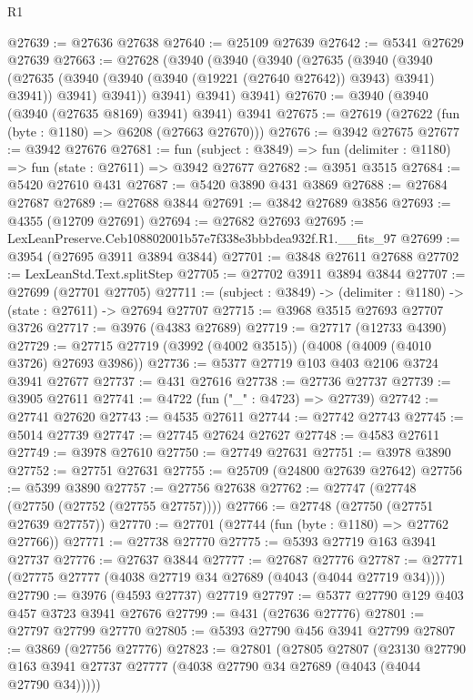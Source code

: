 \begin{lexlean}{R1}
\begin{coremodule}
@27639 := @27636 @27638
@27640 := @25109 @27639
@27642 := @5341 @27629 @27639
@27663 := @27628
    (@3940
      (@3940
        (@3940
          (@27635
            (@3940
              (@3940
                (@27635 (@3940 (@3940 (@3940 (@19221 (@27640 @27642)) @3943) @3941) @3941))
                @3941)
              @3941))
          @3941)
        @3941)
      @3941)
@27670 := @3940 (@3940 (@3940 (@27635 @8169) @3941) @3941) @3941
@27675 := @27619 (@27622 (fun (byte : @1180) => @6208 (@27663 @27670)))
@27676 := @3942 @27675
@27677 := @3942 @27676
@27681 := fun (subject : @3849) => fun (delimiter : @1180) => fun (state : @27611) => @3942 @27677
@27682 := @3951 @3515
@27684 := @5420 @27610 @431
@27687 := @5420 @3890 @431 @3869
@27688 := @27684 @27687
@27689 := @27688 @3844
@27691 := @3842 @27689 @3856
@27693 := @4355 (@12709 @27691)
@27694 := @27682 @27693
@27695 := LexLeanPreserve.Ceb108802001b57e7f338e3bbbdea932f.R1.__fits_97
@27699 := @3954 (@27695 @3911 @3894 @3844)
@27701 := @3848 @27611 @27688
@27702 := LexLeanStd.Text.splitStep
@27705 := @27702 @3911 @3894 @3844
@27707 := @27699 (@27701 @27705)
@27711 := (subject : @3849) -> (delimiter : @1180) -> (state : @27611) -> @27694 @27707
@27715 := @3968 @3515 @27693 @27707 @3726
@27717 := @3976 (@4383 @27689)
@27719 := @27717 (@12733 @4390)
@27729 := @27715 @27719 (@3992 (@4002 @3515)) (@4008 (@4009 (@4010 @3726) @27693 @3986))
@27736 := @5377 @27719 @103 @403 @2106 @3724 @3941 @27677
@27737 := @431 @27616
@27738 := @27736 @27737
@27739 := @3905 @27611
@27741 := @4722 (fun ("_" : @4723) => @27739)
@27742 := @27741 @27620
@27743 := @4535 @27611
@27744 := @27742 @27743
@27745 := @5014 @27739
@27747 := @27745 @27624 @27627
@27748 := @4583 @27611
@27749 := @3978 @27610
@27750 := @27749 @27631
@27751 := @3978 @3890
@27752 := @27751 @27631
@27755 := @25709 (@24800 @27639 @27642)
@27756 := @5399 @3890
@27757 := @27756 @27638
@27762 := @27747 (@27748 (@27750 (@27752 (@27755 @27757))))
@27766 := @27748 (@27750 (@27751 @27639 @27757))
@27770 := @27701 (@27744 (fun (byte : @1180) => @27762 @27766))
@27771 := @27738 @27770
@27775 := @5393 @27719 @163 @3941 @27737
@27776 := @27637 @3844
@27777 := @27687 @27776
@27787 := @27771 (@27775 @27777 (@4038 @27719 @34 @27689 (@4043 (@4044 @27719 @34))))
@27790 := @3976 (@4593 @27737) @27719
@27797 := @5377 @27790 @129 @403 @457 @3723 @3941 @27676
@27799 := @431 (@27636 @27776)
@27801 := @27797 @27799 @27770
@27805 := @5393 @27790 @456 @3941 @27799
@27807 := @3869 (@27756 @27776)
@27823 := @27801
    (@27805
      @27807
      (@23130 @27790 @163 @3941 @27737 @27777 (@4038 @27790 @34 @27689 (@4043 (@4044 @27790 @34)))))

\end{coremodule}
\end{lexlean}
